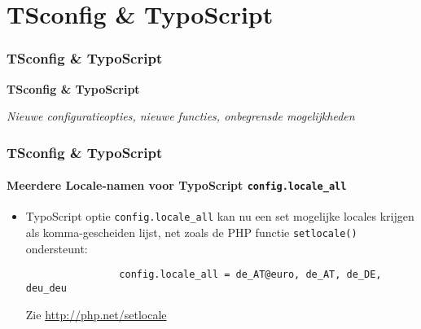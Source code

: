 %

\section{TSconfig \& TypoScript}
\begin{frame}[fragile]
	\frametitle{TSconfig \& TypoScript}

	\begin{center}\huge{\color{typo3darkgrey}\textbf{TSconfig \& TypoScript}}\end{center}
	\begin{center}\large{\textit{Nieuwe configuratieopties, nieuwe functies, onbegrensde mogelijkheden}}\end{center}

\end{frame}

\begin{frame}[fragile]
	\frametitle{TSconfig \& TypoScript}
	\framesubtitle{Meerdere Locale-namen voor TypoScript \texttt{config.locale\_all}}

	\lstset{basicstyle=\small\ttfamily}

	\begin{itemize}

		\item TypoScript optie \texttt{config.locale\_all} kan nu een set mogelijke
			locales krijgen als komma-gescheiden lijst, net zoals de PHP functie
			\texttt{setlocale()} ondersteunt:

			\begin{lstlisting}
				config.locale_all = de_AT@euro, de_AT, de_DE, deu_deu
			\end{lstlisting}

			Zie \url{http://php.net/setlocale}

	\end{itemize}

\end{frame}

